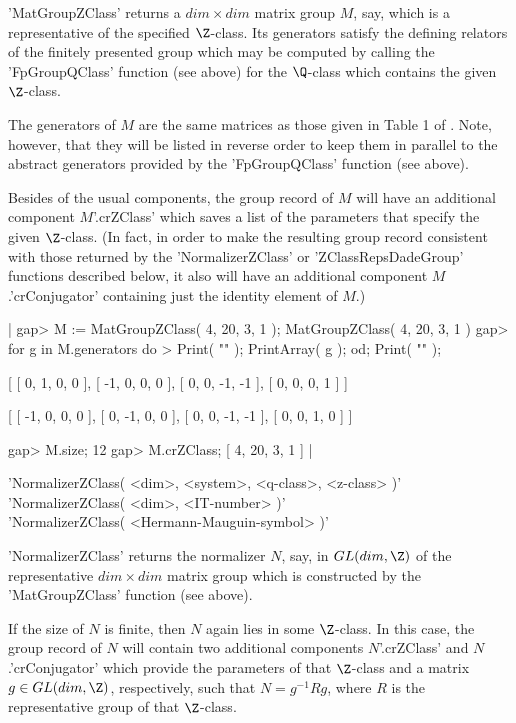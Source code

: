 'MatGroupZClass' returns a $dim \times dim$ matrix  group $M$, say, which
is a representative of  the specified $\Z$-class.  Its generators satisfy
the  defining  relators  of the   finitely  presented group  which may be
computed  by  calling the  'FpGroupQClass' function  (see above)  for the
$\Q$-class which contains the given $\Z$-class.

The generators of $M$ are the same matrices as those given  in Table 1 of
\cite{BBNWZ78}. Note, however, that they will  be listed in reverse order
to  keep them  in parallel  to  the abstract  generators provided by  the
'FpGroupQClass' function (see above).

Besides of  the usual components, the group  record  of $M$ will  have an
additional component  $M$'.crZClass' which saves a list of the parameters
that  specify  the given $\Z$-class.  (In   fact,  in order  to  make the
resulting     group  record  consistent   with    those  returned  by the
'NormalizerZClass' or 'ZClassRepsDadeGroup' functions described below, it
also will have an additional component $M$.'crConjugator' containing just
the identity element of $M$.)

|    gap> M := MatGroupZClass( 4, 20, 3, 1 );
    MatGroupZClass( 4, 20, 3, 1 )
    gap> for g in M.generators do
    >  Print( "\n" ); PrintArray( g ); od; Print( "\n" );

    [ [   0,   1,   0,   0 ],
      [  -1,   0,   0,   0 ],
      [   0,   0,  -1,  -1 ],
      [   0,   0,   0,   1 ] ]

    [ [  -1,   0,   0,   0 ],
      [   0,  -1,   0,   0 ],
      [   0,   0,  -1,  -1 ],
      [   0,   0,   1,   0 ] ]

    gap> M.size;
    12
    gap> M.crZClass;
    [ 4, 20, 3, 1 ] |

\vspace{5mm}
'NormalizerZClass( <dim>, <system>, <q-class>, <z-class> )'%
 \\
'NormalizerZClass( <dim>, <IT-number> )' \\
'NormalizerZClass( <Hermann-Mauguin-symbol> )'

'NormalizerZClass' returns the  normalizer $N$, say,  in $GL(dim,\Z)$  of
the representative $dim \times dim$  matrix group which is constructed by
the 'MatGroupZClass' function (see above).

If the size of $N$ is finite,  then $N$ again lies in some $\Z$-class. In
this case, the group record of $N$ will contain two additional components
$N$'.crZClass'  and $N$.'crConjugator'  which  provide the parameters  of
that  $\Z$-class  and a  matrix $g  \in  GL(dim,\Z)$,  respectively, such
that $N = g^{-1}  R  g$, where $R$ is   the representative group of  that
$\Z$-class.

